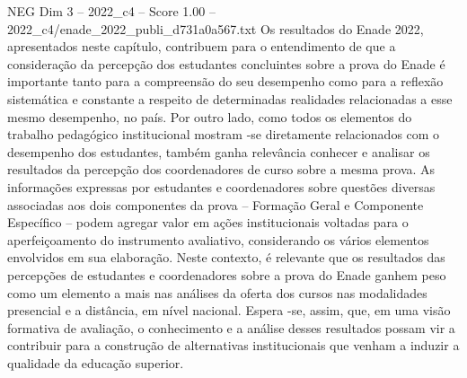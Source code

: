 \begin{textsample}{NEG Dim 3 – 2022\_c4 – Score 1.00 – 2022\_c4/enade\_2022\_publi\_d731a0a567.txt}
Os resultados do Enade 2022, apresentados neste capítulo, contribuem para o entendimento de que a consideração da percepção dos estudantes concluintes sobre a prova do Enade é importante tanto para a compreensão do seu desempenho como para a reflexão sistemática e constante a respeito de determinadas realidades relacionadas a esse mesmo desempenho, no país.
Por outro lado, como todos os elementos do trabalho pedagógico institucional mostram -se diretamente relacionados com o desempenho dos estudantes, também ganha relevância conhecer e analisar os resultados da percepção dos coordenadores de curso sobre a mesma prova.
As informações expressas por estudantes e coordenadores sobre questões diversas associadas aos dois componentes da prova – Formação Geral e Componente Específico – podem agregar valor em ações institucionais voltadas para o aperfeiçoamento do instrumento avaliativo, considerando os vários elementos envolvidos em sua elaboração.
Neste contexto, é relevante que os resultados das percepções de estudantes e coordenadores sobre a prova do Enade ganhem peso como um elemento a mais nas análises da oferta dos cursos nas modalidades presencial e a distância, em nível nacional.
Espera -se, assim, que, em uma visão formativa de avaliação, o conhecimento e a análise desses resultados possam vir a contribuir para a construção de alternativas institucionais que venham a induzir a qualidade da educação superior.

\end{textsample}
